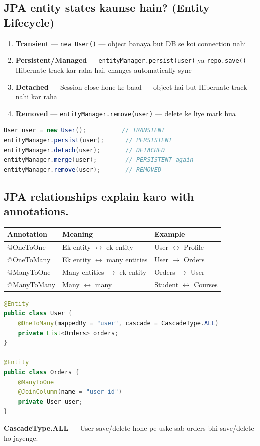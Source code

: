 \documentclass[12pt,a4paper]{article}
\begin{document}
\subsection{JPA entity states kaunse hain? (Entity Lifecycle)}

\begin{answerbox}
\begin{enumerate}
    \item \textbf{Transient} --- \texttt{new User()} --- object banaya but DB se koi connection nahi
    \item \textbf{Persistent/Managed} --- \texttt{entityManager.persist(user)} ya \texttt{repo.save()} --- Hibernate track kar raha hai, changes automatically sync
    \item \textbf{Detached} --- Session close hone ke baad --- object hai but Hibernate track nahi kar raha
    \item \textbf{Removed} --- \texttt{entityManager.remove(user)} --- delete ke liye mark hua
\end{enumerate}
\begin{lstlisting}[language=Java]
User user = new User();          // TRANSIENT
entityManager.persist(user);      // PERSISTENT
entityManager.detach(user);       // DETACHED
entityManager.merge(user);        // PERSISTENT again
entityManager.remove(user);       // REMOVED
\end{lstlisting}
\end{answerbox}

\subsection{JPA relationships explain karo with annotations.}

\begin{answerbox}
\begin{center}
\begin{tabular}{>{\ttfamily}l p{5cm} p{4cm}}
\toprule
\textbf{Annotation} & \textbf{Meaning} & \textbf{Example} \\
\midrule
@OneToOne & Ek entity $\leftrightarrow$ ek entity & User $\leftrightarrow$ Profile \\
@OneToMany & Ek entity $\leftrightarrow$ many entities & User $\rightarrow$ Orders \\
@ManyToOne & Many entities $\rightarrow$ ek entity & Orders $\rightarrow$ User \\
@ManyToMany & Many $\leftrightarrow$ many & Student $\leftrightarrow$ Courses \\
\bottomrule
\end{tabular}
\end{center}
\begin{lstlisting}[language=Java]
@Entity
public class User {
    @OneToMany(mappedBy = "user", cascade = CascadeType.ALL)
    private List<Orders> orders;
}

@Entity
public class Orders {
    @ManyToOne
    @JoinColumn(name = "user_id")
    private User user;
}
\end{lstlisting}
\textbf{CascadeType.ALL} --- User save/delete hone pe uske sab orders bhi save/delete ho jayenge.
\end{answerbox}
\end{document}
